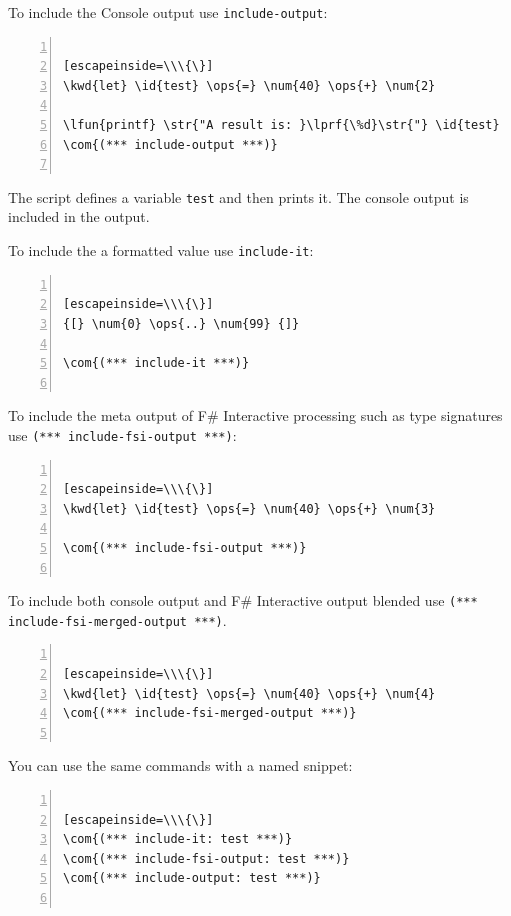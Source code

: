 \documentclass{article}
\newcommand{\id}[1]{\textcolor{black}{#1}}
\newcommand{\com}[1]{\textcolor{officegreen}{#1}}
\newcommand{\kwd}[1]{\textcolor{navy}{#1}}
\newcommand{\num}[1]{\textcolor{officegreen}{#1}}
\newcommand{\ops}[1]{\textcolor{purple}{#1}}
\newcommand{\str}[1]{\textcolor{olive}{#1}}
\begin{document}
To include the Console output use \texttt{include-output}:
\begin{lstlisting}[numbers=left]

[escapeinside=\\\{\}]
\kwd{let} \id{test} \ops{=} \num{40} \ops{+} \num{2}

\lfun{printf} \str{"A result is: }\lprf{\%d}\str{"} \id{test}
\com{(*** include-output ***)}


\end{lstlisting}



The script defines a variable \texttt{test} and then prints it. The console output is included
in the output.


To include the a formatted value use \texttt{include-it}:
\begin{lstlisting}[numbers=left]

[escapeinside=\\\{\}]
{[} \num{0} \ops{..} \num{99} {]}

\com{(*** include-it ***)}


\end{lstlisting}



To include the meta output of F\# Interactive processing such as type signatures use \texttt{(*** include-fsi-output ***)}:
\begin{lstlisting}[numbers=left]

[escapeinside=\\\{\}]
\kwd{let} \id{test} \ops{=} \num{40} \ops{+} \num{3}

\com{(*** include-fsi-output ***)}


\end{lstlisting}



To include both console output and F\# Interactive output blended use \texttt{(*** include-fsi-merged-output ***)}.
\begin{lstlisting}[numbers=left]

[escapeinside=\\\{\}]
\kwd{let} \id{test} \ops{=} \num{40} \ops{+} \num{4}
\com{(*** include-fsi-merged-output ***)}


\end{lstlisting}



You can use the same commands with a named snippet:
\begin{lstlisting}[numbers=left]

[escapeinside=\\\{\}]
\com{(*** include-it: test ***)}
\com{(*** include-fsi-output: test ***)}
\com{(*** include-output: test ***)}


\end{lstlisting}
\end{document}
